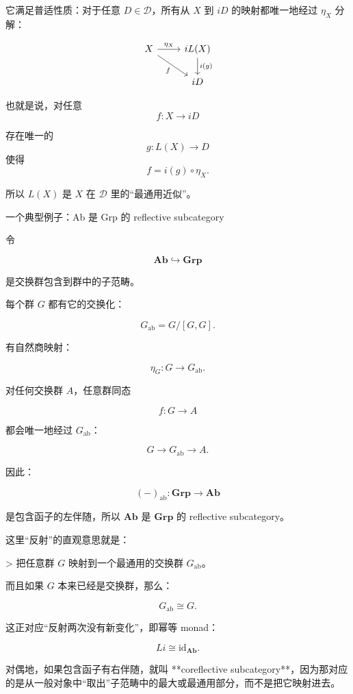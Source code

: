 \documentclass{beamer}
\begin{document}
\begin{frame}[fragile]

它满足普适性质：对于任意 $D\in\mathcal D$，所有从 $X$ 到 $iD$ 的映射都唯一地经过 $\eta_X$ 分解：

\[
\begin{tikzcd}
X \arrow[r,"\eta_X"] \arrow[dr,"f"'] & iL(X) \arrow[d,"i(g)"] \\
& iD
\end{tikzcd}
\]

也就是说，对任意
$$
f:X\to iD
$$

存在唯一的
$$
g:L(X)\to D
$$
使得
$$
f=i(g)\circ\eta_X.
$$

所以 $L(X)$ 是 $X$ 在 $\mathcal D$ 里的“最通用近似”。
\end{frame}

\begin{frame}{一个典型例子：Ab 是 Grp 的 reflective subcategory}
\begin{markdown}

令

$$
\mathbf{Ab}\hookrightarrow\mathbf{Grp}
$$

是交换群包含到群中的子范畴。

每个群 $G$ 都有它的交换化：

$$
G_{\mathrm{ab}}=G/[G,G].
$$

有自然商映射：

$$
\eta_G:G\to G_{\mathrm{ab}}.
$$

对任何交换群 $A$，任意群同态

$$
f:G\to A
$$

都会唯一地经过 $G_{\mathrm{ab}}$：

$$
G\to G_{\mathrm{ab}}\to A.
$$

因此：

$$
(-)_{\mathrm{ab}}:\mathbf{Grp}\to\mathbf{Ab}
$$

是包含函子的左伴随，所以 $\mathbf{Ab}$ 是 $\mathbf{Grp}$ 的 reflective subcategory。

这里“反射”的直观意思就是：

> 把任意群 $G$ 映射到一个最通用的交换群 $G_{\mathrm{ab}}$。

而且如果 $G$ 本来已经是交换群，那么：

$$
G_{\mathrm{ab}}\cong G.
$$

这正对应“反射两次没有新变化”，即幂等 monad：

$$
L i\cong \mathrm{id}_{\mathbf{Ab}}.
$$

对偶地，如果包含函子有右伴随，就叫 **coreflective subcategory**，因为那对应的是从一般对象中“取出”子范畴中的最大或最通用部分，而不是把它映射进去。
\end{markdown}
\end{frame}
\end{document}
